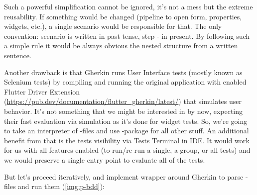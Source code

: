 Such a powerful simplification cannot be ignored, it's not a mess but the extreme reusability. If something would be 
changed (pipeline to open form, properties, widgets, etc.), a single scenario would be responsible for that. The only 
convention: scenario is written in past tense, step - in present. By following such a simple rule it would be always 
obvious the nested structure from a written sentence. 

Another drawback is that Gherkin runs User Interface tests (mostly known as Selenium tests) by compiling and running 
the original application with enabled Flutter Driver Extension 
(\href{https://pub.dev/documentation/flutter_gherkin/latest/}{https://pub.dev/documentation/flutter\_gherkin/latest/}) 
that simulates user behavior. It's not something that we might be interested in by now, expecting their fast evaluation 
via simulation as it's done for widget tests. So, we're going to take an interpreter of -files and use 
-package for all other stuff. An additional benefit from that is the tests visibility via Tests 
Terminal in IDE. It would work for us with all features enabled (to run/re-run a single, a group, or all tests) and 
we would preserve a single entry point to evaluate all of the tests.


But let's proceed iteratively, and implement wrapper around Gherkin to parse -files and run them 
(\cref{img:p-bdd}):


